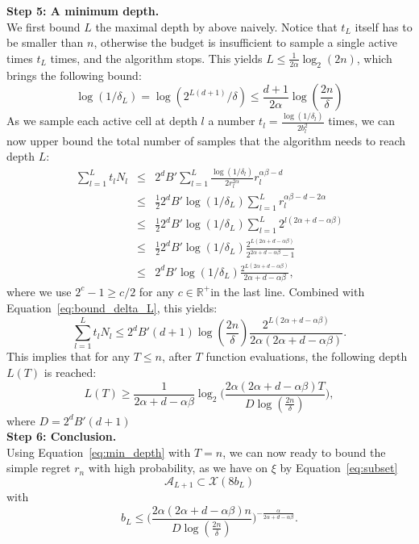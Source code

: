\documentclass[final,12pt]{colt2018}
\begin{document}
\textbf{Step 5: A minimum depth.}\\
We first bound $L$ the maximal depth by above naively. Notice that $t_L$ itself has to be smaller than $n$, otherwise the budget is insufficient to sample a single active times $t_L$ times, and the algorithm stops. This yields $L \leq \frac{1}{2\alpha}\log_2(2n)$, which brings the following bound:
\begin{equation}\label{eq:bound_delta_L}
\log(1/\delta_L) = \log(2^{L(d+1)}/\delta) \leq \frac{d+1}{2\alpha}\log(\frac{2n}{\delta})
\end{equation}
As we sample each active cell at depth $l$ a number $t_l = \frac{\log(1/\delta_l)}{2 b_l^2}$ times, we can now upper bound the total number of samples that the algorithm needs to reach depth $L$:
\begin{eqnarray*}
\sum_{l=1}^L t_l N_l & \leq & 2^d B' \sum_{l=1}^L \frac{\log(1/\delta_l)}{2 r_l^{2\alpha}} r_l^{\alpha\beta-d}\\
& \leq & \frac{1}{2}2^d B' \log(1/\delta_L) \sum_{l=1}^L r_l^{\alpha\beta-d - 2\alpha} \\
& \leq & \frac{1}{2}2^d B' \log(1/\delta_L) \sum_{l=1}^L 2^{l(2\alpha+ d - \alpha\beta)} \\
& \leq & \frac{1}{2} 2^d B' \log(1/\delta_L) \frac{2^{L(2\alpha + d - \alpha\beta)}}{2^{2\alpha + d - \alpha\beta} - 1} \\
& \leq & 2^d B' \log(1/\delta_L) \frac{2^{L(2\alpha + d - \alpha\beta)}}{2\alpha + d - \alpha\beta},
\end{eqnarray*}
where we use $2^c - 1 \geq c/2$ for any $c \in \mathbb R^+$in the last line. Combined with Equation~\eqref{eq:bound_delta_L}, this yields:
\begin{equation}\label{eq:bound_budget}
\sum_{l=1}^L t_l N_l \leq 2^d B' (d+1) \log\left(\frac{2 n}{\delta}\right) \frac{2^{L(2\alpha + d - \alpha\beta)}}{2\alpha(2\alpha + d - \alpha\beta)}.
\end{equation}
This implies that for any $T \leq n$, after $T$ function evaluations, the following depth $L(T)$ is reached:
\begin{equation}\label{eq:min_depth}
L(T) \geq \frac{1}{2\alpha + d - \alpha\beta}\log_2\Big(\frac{2\alpha(2\alpha + d - \alpha\beta)T}{D\log(\frac{2 n}{\delta})}\Big),
\end{equation}
where $D = 2^d B' (d+1)$\\
\textbf{Step 6: Conclusion.}\\
Using Equation~\eqref{eq:min_depth} with $T = n$, we can now ready to bound the simple regret $r_n$ with high probability, as we have on $\xi$ by Equation~\eqref{eq:subset}
\begin{equation}
\mathcal{A}_{L+1} \subset \mathcal X(8b_L)
\end{equation}
with $$b_L \leq \Big(\frac{2\alpha(2\alpha + d - \alpha\beta)n}{D\log(\frac{2n}{\delta})}\Big)^{-\frac{\alpha}{2\alpha + d - \alpha\beta}}.$$
\end{document}

